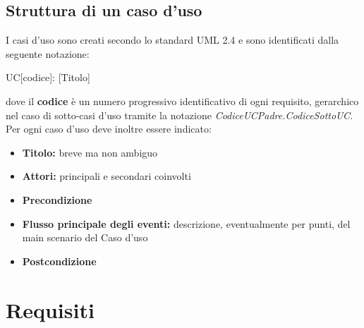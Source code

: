 \documentclass[12pt,a4paper]{article}
\begin{document}
\subsection{Struttura di un caso d'uso}
I casi d'uso sono creati secondo lo standard UML 2.4 e sono identificati dalla seguente notazione:
\begin{center}
	UC[codice]: [Titolo]
\end{center}
dove il \textbf{codice} è un numero progressivo identificativo di ogni requisito, gerarchico nel  caso di sotto-casi d'uso tramite la notazione \textit{CodiceUCPadre.CodiceSottoUC}. Per ogni caso d'uso deve inoltre essere indicato:
\begin{itemize}
	\item \textbf{Titolo:} breve ma non ambiguo
	\item \textbf{Attori:} principali e secondari coinvolti
	\item \textbf{Precondizione}
	\item \textbf{Flusso principale degli eventi:} descrizione, eventualmente per punti, del main scenario del Caso d'uso
	\item \textbf{Postcondizione}
\end{itemize}



\newpage
\section{Requisiti}
\end{document}

